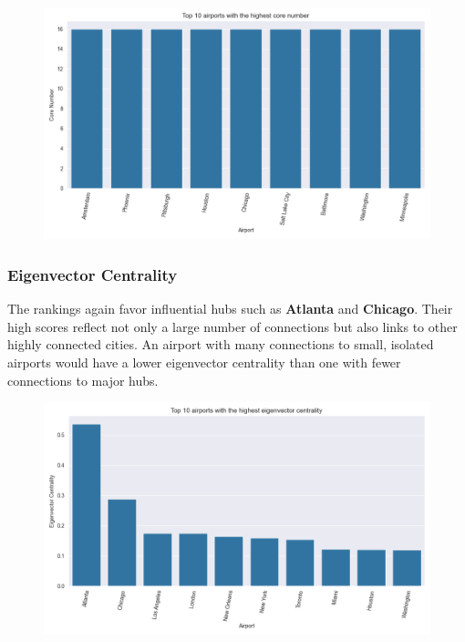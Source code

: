 \documentclass[12pt]{article}
\begin{document}
    \begin{figure}[H]
        \centering
        \includegraphics[width=0.8\linewidth]{img/core_number}
    \end{figure}

    \subsubsection{Eigenvector Centrality}
    The rankings again favor influential hubs such as \textbf{Atlanta} and \textbf{Chicago}. Their high scores reflect not only a large number of connections but also links to other highly connected cities. An airport with many connections to small, isolated airports would have a lower eigenvector centrality than one with fewer connections to major hubs.

    \begin{figure}[H]
        \centering
        \includegraphics[width=0.8\linewidth]{img/eigenvector_centrality}
    \end{figure}
\end{document}
